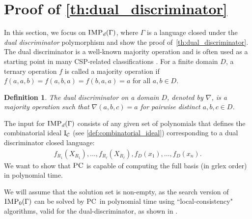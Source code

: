 \documentclass[11pt]{article}
\newcommand{\Cc}{\mathcal{C}}
\newcommand{\IMP}{\textsc{IMP}}
\newcommand{\PC}{\textsc{PC}}
\newcommand{\grlex}{\textsf{grlex }}
\newcommand{\I}{\emph{$\rm{I}$}}
\newcommand{\1}{\textbf{1}}
\newcommand{\GB}{\text{Gr\"{o}bner} }
\newtheorem{definition}[theorem]{Definition}
\begin{document}
\section{Proof of \cref{th:dual_discriminator}}\label{sect:dual-proof}
In this section, we focus on $\IMP_d(\Gamma)$, where $\Gamma$ is a language closed under the \emph{dual discriminator} polymorphism and show the proof of~\cref{th:dual_discriminator}. 
The dual discriminator is a well-known majority operation \cite{Jeavons:1997:CPC,barto_et_al:DFU:2017:6959} and is often used as a starting point in many CSP-related classifications \cite{barto_et_al:DFU:2017:6959}. For a finite domain $D$, a ternary operation $f$ is called a majority operation if  $f(a,a,b)=f(a,b,a)=f(b,a,a)=a$ for all $a,b\in D$. 
\begin{definition}\label{def:dual discriminator}
  The \emph{dual discriminator} on a domain $D$, denoted by $\nabla$, is a majority operation such that $\nabla(a,b,c)=a$ for pairwise distinct $a,b,c\in D$.
\end{definition}

The input for $\IMP_d(\Gamma)$ consists of any given set of polynomials that defines the combinatorial ideal $\I_\Cc$ (see \cref{def:combinatorial_ideal}) corresponding to a dual discriminator closed language: 
\begin{align}\label{eq:dual_generators}
    f_{R_1}(X_{R_1}),\ldots,f_{R_\ell}(X_{R_\ell}),f_D(x_1),\ldots,f_D(x_n).
\end{align}
We want to show that $\PC$ is capable of computing the full \GB basis (in \grlex order) in polynomial time.

We will assume that the solution set is non-empty, as the search version of $\IMP_0(\Gamma)$ can be solved by \PC\ in polynomial time using ``local-consistency" algorithms, valid for the dual-discriminator, as shown in \cite{JeffersonJGD13}.

\end{document}

